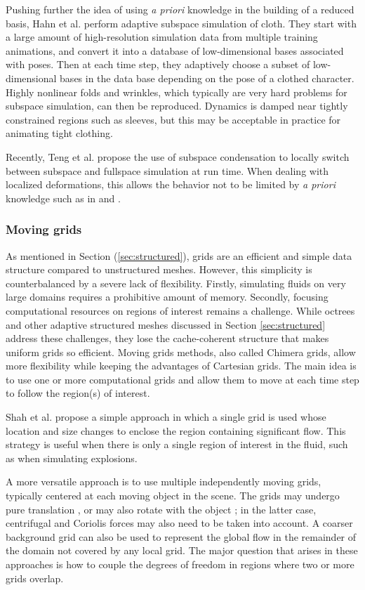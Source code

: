 Pushing further the idea of using \textit{a priori} knowledge in the building of a reduced basis, Hahn et al. \cite{Hahn2014} perform adaptive subspace simulation of cloth. They start with a large amount of high-resolution simulation data from multiple training animations, and convert it into a database of low-dimensional bases associated with poses. Then at each time step, they adaptively choose a subset of low-dimensional bases in the data base depending on the pose of a clothed character.
Highly nonlinear folds and wrinkles, which typically are very hard problems for subspace simulation, can then be reproduced. Dynamics is damped near tightly constrained regions such as sleeves, but this may be acceptable in practice for animating tight clothing.

Recently, Teng et al. \cite{Teng2015} propose the use of subspace condensation to locally switch between subspace and fullspace simulation at run time. When dealing with localized deformations, this allows the behavior not to be limited by \textit{a priori} knowledge such as in \cite{Harmon2013} and \cite{Hahn2014}.
\subsubsection{Moving grids}
\label{sec:movingMesh}

As mentioned in Section (\ref{sec:structured}), grids are an efficient and simple data structure compared to unstructured meshes. However, this simplicity is counterbalanced by a severe lack of flexibility. Firstly, simulating fluids on very large domains requires a prohibitive amount of memory. Secondly, focusing computational resources on regions of interest remains a challenge.
While octrees and other adaptive structured meshes discussed in Section \ref{sec:structured} address these challenges, they lose the cache-coherent structure that makes uniform grids so efficient.
Moving grids methods, also called Chimera grids, allow more flexibility while keeping the advantages of Cartesian grids. The main idea is to use one or more computational grids and allow them to move at each time step to follow the region(s) of interest.

Shah et al. \cite{Shah2004} propose a simple approach in which a single grid is used whose location and size changes to enclose the region containing significant flow.
This strategy is useful when there is only a single region of interest in the fluid, such as when simulating explosions.

A more versatile approach is to use multiple independently moving grids, typically centered at each moving object in the scene.
The grids may undergo pure translation \cite{Cohen2010}, or may also rotate with the object \cite{Dobashi2008:adaptiveGrid,English2013}; in the latter case, centrifugal and Coriolis forces may also need to be taken into account.
A coarser background grid can also be used to represent the global flow in the remainder of the domain not covered by any local grid.
The major question that arises in these approaches is how to couple the degrees of freedom in regions where two or more grids overlap.

